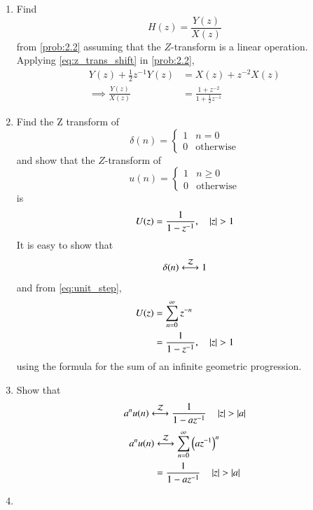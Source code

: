 \documentclass[journal,12pt,twocolumn]{IEEEtran}
\theoremstyle{remark}
\renewcommand\thesection{\arabic{section}}
\begin{document}
\begin{enumerate}[label=\thesection.\arabic*]
\item Find
%
\begin{equation}
H(z) = \frac{Y(z)}{X(z)}
\end{equation}
from  \eqref{prob:2.2} assuming that the $Z$-transform is a linear operation.
\\
\solution  Applying \eqref{eq:z_trans_shift} in \eqref{prob:2.2},
\begin{align}
Y(z) + \frac{1}{2}z^{-1}Y(z) &= X(z)+z^{-2}X(z)
\\
\implies \frac{Y(z)}{X(z)} &= \frac{1 + z^{-2}}{1 + \frac{1}{2}z^{-1}}
\label{eq:freq_resp}
\end{align}
%
\item Find the Z transform of 
\begin{equation}
\delta(n)
=
\begin{cases}
1 & n = 0
\\
0 & \text{otherwise}
\end{cases}
\end{equation}
and show that the $Z$-transform of
\begin{equation}
\label{eq:unit_step}
u(n)
=
\begin{cases}
1 & n \ge 0
\\
0 & \text{otherwise}
\end{cases}
\end{equation}
is
\begin{equation}
U(z) = \frac{1}{1-z^{-1}}, \quad \left\vert z\right\vert > 1
\end{equation}
\solution It is easy to show that
\begin{equation}
\delta(n) \system{Z} 1
\end{equation}
and from \eqref{eq:unit_step},
\begin{align}
U(z) &= \sum _{n= 0}^{\infty}z^{-n}
\\
&=\frac{1}{1-z^{-1}}, \quad \left\vert z\right\vert > 1
\end{align}
using the formula for the sum of an infinite geometric progression.
%
\item Show that 
\begin{equation}
\label{eq:anun}
a^nu(n) \system{Z} \frac{1}{1-az^{-1}} \quad \abs{z} > \abs{a}
\end{equation}
\solution 
\begin{align}
	a^nu(n) &\system{Z} \sum_{n = 0}^{\infty}\brak{az^{-1}}^n \\
			&= \frac{1}{1-az^{-1}} \quad \abs{z} > \abs{a}
\end{align}
%
\item 

\end{enumerate}
\end{document}
